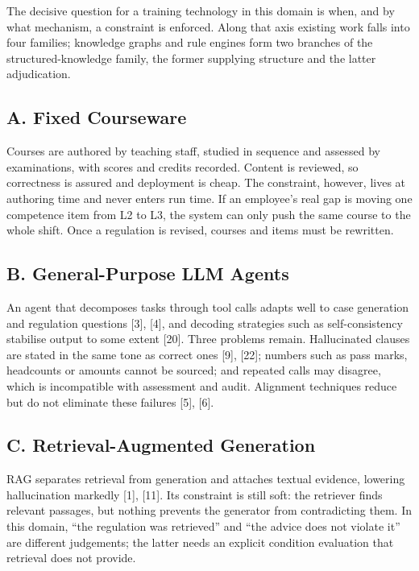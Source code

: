 \documentclass[conference]{IEEEtran}
\begin{document}
The decisive question for a training technology in this domain is when, and by what mechanism, a constraint is enforced. Along that axis existing work falls into four families; knowledge graphs and rule engines form two branches of the structured-knowledge family, the former supplying structure and the latter adjudication.


\subsection{A. Fixed Courseware}

Courses are authored by teaching staff, studied in sequence and assessed by examinations, with scores and credits recorded. Content is reviewed, so correctness is assured and deployment is cheap. The constraint, however, lives at authoring time and never enters run time. If an employee's real gap is moving one competence item from L2 to L3, the system can only push the same course to the whole shift. Once a regulation is revised, courses and items must be rewritten.


\subsection{B. General-Purpose LLM Agents}

An agent that decomposes tasks through tool calls adapts well to case generation and regulation questions [3], [4], and decoding strategies such as self-consistency stabilise output to some extent [20]. Three problems remain. Hallucinated clauses are stated in the same tone as correct ones [9], [22]; numbers such as pass marks, headcounts or amounts cannot be sourced; and repeated calls may disagree, which is incompatible with assessment and audit. Alignment techniques reduce but do not eliminate these failures [5], [6].


\subsection{C. Retrieval-Augmented Generation}

RAG separates retrieval from generation and attaches textual evidence, lowering hallucination markedly [1], [11]. Its constraint is still soft: the retriever finds relevant passages, but nothing prevents the generator from contradicting them. In this domain, ``the regulation was retrieved'' and ``the advice does not violate it'' are different judgements; the latter needs an explicit condition evaluation that retrieval does not provide.
\end{document}
